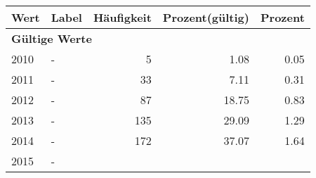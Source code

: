      \begin{longtable}{lXrrr}
     \toprule
     \textbf{Wert} & \textbf{Label} & \textbf{Häufigkeit} & \textbf{Prozent(gültig)} & \textbf{Prozent} \\
     \endhead
     \midrule
     \multicolumn{5}{l}{\textbf{Gültige Werte}}\\

     2010 &
     \multicolumn{1}{X}{ -  } &


       \num{5} &
       \num[round-mode=places,round-precision=2]{1,08} &
         \num[round-mode=places,round-precision=2]{0,05} \\

     2011 &
     \multicolumn{1}{X}{ -  } &


       \num{33} &
       \num[round-mode=places,round-precision=2]{7,11} &
         \num[round-mode=places,round-precision=2]{0,31} \\

     2012 &
     \multicolumn{1}{X}{ -  } &


       \num{87} &
       \num[round-mode=places,round-precision=2]{18,75} &
         \num[round-mode=places,round-precision=2]{0,83} \\

     2013 &
     \multicolumn{1}{X}{ -  } &


       \num{135} &
       \num[round-mode=places,round-precision=2]{29,09} &
         \num[round-mode=places,round-precision=2]{1,29} \\

     2014 &
     \multicolumn{1}{X}{ -  } &


       \num{172} &
       \num[round-mode=places,round-precision=2]{37,07} &
         \num[round-mode=places,round-precision=2]{1,64} \\

     2015 &
     \multicolumn{1}{X}{ -  } &



\end{longtable}
